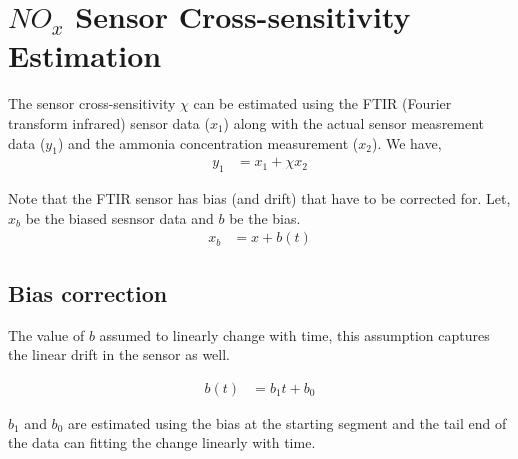 \section{$NO_x$ Sensor Cross-sensitivity Estimation}

The sensor cross-sensitivity $\chi$ can be estimated using the FTIR (Fourier
transform infrared) sensor data ($x_1$) along with the actual sensor measrement
data ($y_1$) and the ammonia concentration measurement ($x_2$). We have,
\begin{align*}
    y_1 &= x_1 + \chi x_2
\end{align*}

Note that the FTIR sensor has bias (and drift) that have to be corrected for.
Let, $x_b$ be the biased sesnsor data and $b$ be the bias.
\begin{align*}
    x_b &= x + b(t)
\end{align*}

\subsection{Bias correction}
The value of $b$ assumed to linearly change with time, this assumption captures
the linear drift in the sensor as well.

\begin{align*}
    b(t) &= b_1 t + b_0
\end{align*}

$b_1$ and $b_0$ are estimated using the bias at the starting segment and the
tail end of the data can fitting the change linearly with time.


